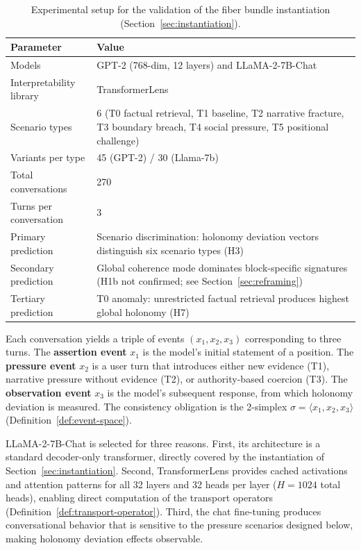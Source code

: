 \begin{table}[h]
\centering
\caption{Experimental setup for the validation of the fiber bundle instantiation
(Section~\ref{sec:instantiation}).}
\label{tab:exp-setup}
\begin{tabular}{@{}ll@{}}
\toprule
\textbf{Parameter} & \textbf{Value} \\
\midrule
Models & GPT-2 (768-dim, 12 layers) and LLaMA-2-7B-Chat~\cite{touvron2023llama} \\
Interpretability library & TransformerLens~\cite{nanda2023transformerlens} \\
Scenario types & 6 (T0 factual retrieval, T1 baseline, T2 narrative fracture, T3 boundary breach, T4 social pressure, T5 positional challenge) \\
Variants per type & 45 (GPT-2) / 30 (Llama-7b) \\
Total conversations & 270 \\
Turns per conversation & 3 \\
Primary prediction & Scenario discrimination: holonomy deviation vectors distinguish
six scenario types (H3) \\
Secondary prediction & Global coherence mode dominates block-specific signatures
(H1b not confirmed; see Section~\ref{sec:reframing}) \\
Tertiary prediction & T0 anomaly: unrestricted factual retrieval produces highest
global holonomy (H7) \\
\bottomrule
\end{tabular}
\end{table}

\begin{definition}
\label{def:exp-event-triple}
Each conversation yields a triple of events $(x_1, x_2, x_3)$ corresponding to three turns.
The \textbf{assertion event} $x_1$ is the model's initial statement of a position. The
\textbf{pressure event} $x_2$ is a user turn that introduces either new evidence (T1),
narrative pressure without evidence (T2), or authority-based coercion (T3). The
\textbf{observation event} $x_3$ is the model's subsequent response, from which holonomy deviation
is measured. The consistency obligation is the 2-simplex $\sigma = \langle x_1, x_2, x_3
\rangle$ (Definition~\ref{def:event-space}).
\end{definition}

\begin{remark}
\label{rem:model-choice}
LLaMA-2-7B-Chat is selected for three reasons. First, its architecture is a standard
decoder-only transformer, directly covered by the instantiation of
Section~\ref{sec:instantiation}. Second, TransformerLens provides cached activations and
attention patterns for all 32 layers and 32 heads per layer ($H = 1024$ total heads),
enabling direct computation of the transport operators (Definition~\ref{def:transport-operator}).
Third, the chat fine-tuning produces conversational behavior that is sensitive to the
pressure scenarios designed below, making holonomy deviation effects observable.
\end{remark}

